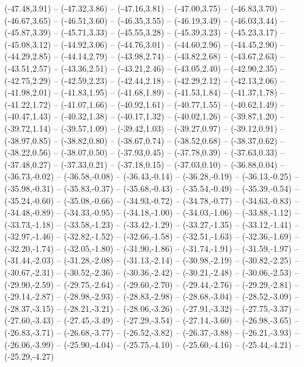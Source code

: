 {  (-47.48,3.91) -- (-47.32,3.86) -- (-47.16,3.81) -- (-47.00,3.75) -- (-46.83,3.70) -- (-46.67,3.65) -- (-46.51,3.60) --
  (-46.35,3.55) -- (-46.19,3.49) -- (-46.03,3.44) -- (-45.87,3.39) -- (-45.71,3.33) -- (-45.55,3.28) -- (-45.39,3.23) --
  (-45.23,3.17) -- (-45.08,3.12) -- (-44.92,3.06) -- (-44.76,3.01) -- (-44.60,2.96) -- (-44.45,2.90) -- (-44.29,2.85) --
  (-44.14,2.79) -- (-43.98,2.74) -- (-43.82,2.68) -- (-43.67,2.63) -- (-43.51,2.57) -- (-43.36,2.51) -- (-43.21,2.46) --
  (-43.05,2.40) -- (-42.90,2.35) -- (-42.75,2.29) -- (-42.59,2.23) -- (-42.44,2.18) -- (-42.29,2.12) -- (-42.13,2.06) --
  (-41.98,2.01) -- (-41.83,1.95) -- (-41.68,1.89) -- (-41.53,1.84) -- (-41.37,1.78) -- (-41.22,1.72) -- (-41.07,1.66) --
  (-40.92,1.61) -- (-40.77,1.55) -- (-40.62,1.49) -- (-40.47,1.43) -- (-40.32,1.38) -- (-40.17,1.32) -- (-40.02,1.26) --
  (-39.87,1.20) -- (-39.72,1.14) -- (-39.57,1.09) -- (-39.42,1.03) -- (-39.27,0.97) -- (-39.12,0.91) -- (-38.97,0.85) --
  (-38.82,0.80) -- (-38.67,0.74) -- (-38.52,0.68) -- (-38.37,0.62) -- (-38.22,0.56) -- (-38.07,0.50) -- (-37.93,0.45) --
  (-37.78,0.39) -- (-37.63,0.33) -- (-37.48,0.27) -- (-37.33,0.21) -- (-37.18,0.15) -- (-37.03,0.10) -- (-36.88,0.04) --
  (-36.73,-0.02) -- (-36.58,-0.08) -- (-36.43,-0.14) -- (-36.28,-0.19) -- (-36.13,-0.25) -- (-35.98,-0.31) -- (-35.83,-0.37) --
  (-35.68,-0.43) -- (-35.54,-0.49) -- (-35.39,-0.54) -- (-35.24,-0.60) -- (-35.08,-0.66) -- (-34.93,-0.72) -- (-34.78,-0.77) --
  (-34.63,-0.83) -- (-34.48,-0.89) -- (-34.33,-0.95) -- (-34.18,-1.00) -- (-34.03,-1.06) -- (-33.88,-1.12) -- (-33.73,-1.18) --
  (-33.58,-1.23) -- (-33.42,-1.29) -- (-33.27,-1.35) -- (-33.12,-1.41) -- (-32.97,-1.46) -- (-32.82,-1.52) -- (-32.66,-1.58) --
  (-32.51,-1.63) -- (-32.36,-1.69) -- (-32.20,-1.74) -- (-32.05,-1.80) -- (-31.90,-1.86) -- (-31.74,-1.91) -- (-31.59,-1.97) --
  (-31.44,-2.03) -- (-31.28,-2.08) -- (-31.13,-2.14) -- (-30.98,-2.19) -- (-30.82,-2.25) -- (-30.67,-2.31) -- (-30.52,-2.36) --
  (-30.36,-2.42) -- (-30.21,-2.48) -- (-30.06,-2.53) -- (-29.90,-2.59) -- (-29.75,-2.64) -- (-29.60,-2.70) -- (-29.44,-2.76) --
  (-29.29,-2.81) -- (-29.14,-2.87) -- (-28.98,-2.93) -- (-28.83,-2.98) -- (-28.68,-3.04) -- (-28.52,-3.09) -- (-28.37,-3.15) --
  (-28.21,-3.21) -- (-28.06,-3.26) -- (-27.91,-3.32) -- (-27.75,-3.37) -- (-27.60,-3.43) -- (-27.45,-3.49) -- (-27.29,-3.54) --
  (-27.14,-3.60) -- (-26.98,-3.65) -- (-26.83,-3.71) -- (-26.68,-3.77) -- (-26.52,-3.82) -- (-26.37,-3.88) -- (-26.21,-3.93) --
  (-26.06,-3.99) -- (-25.90,-4.04) -- (-25.75,-4.10) -- (-25.60,-4.16) -- (-25.44,-4.21) -- (-25.29,-4.27)}
